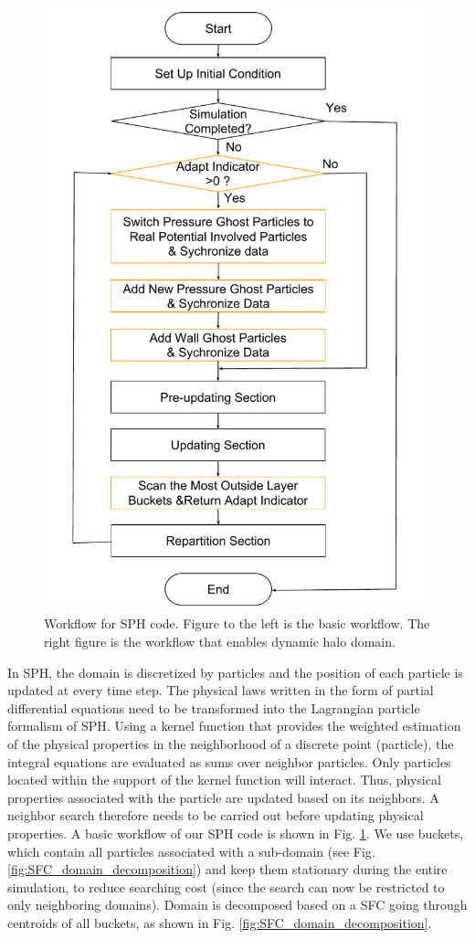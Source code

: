 \begin{figure}[!t]
\includegraphics[scale=0.32]{Chapter-5/Figures/Work_flow_adjust}
\caption{Workflow for SPH code. Figure to the left is the basic workflow. The right figure is the workflow that enables dynamic halo domain.}
\label{fig:Work_flow}
\end{figure}
In SPH, the domain is discretized by particles and the position of each particle is updated at every time step. The physical laws written in the form of partial differential equations need to be transformed into the Lagrangian particle formalism of SPH. Using a kernel function that provides the weighted estimation of the physical properties in the neighborhood of a discrete point (particle), the integral equations are evaluated as sums over neighbor particles. Only particles located within the support of the kernel function will interact. Thus, physical properties associated with the particle are updated based on its neighbors. A neighbor search therefore needs to be carried out before updating physical properties. A basic workflow of our SPH code is shown in Fig. \ref{fig:Work_flow}. We use buckets, which contain all particles associated with a sub-domain (see Fig. \ref{fig:SFC_domain_decomposition}) 
and keep them stationary during the entire simulation, to reduce searching cost (since the search can now be restricted to only neighboring domains).
Domain is decomposed based on a SFC going through centroids of all buckets, as shown in Fig. \ref{fig:SFC_domain_decomposition}.

